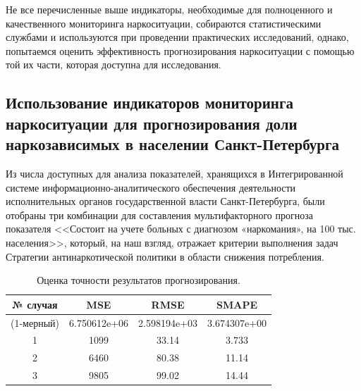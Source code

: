 Не все перечисленные выше индикаторы, необходимые для полноценного и 
качественного мониторинга наркоситуации, собираются статистическими службами 
и используются при проведении практических исследований, однако, попытаемся 
оценить эффективность прогнозирования наркоситуации с помощью той их части, 
которая доступна для исследования.

\subsection{Использование индикаторов мониторинга наркоситуации для 
    прогнозирования доли наркозависимых в населении Санкт-Петербурга}

Из числа доступных для анализа показателей, хранящихся в Интегрированной системе 
информационно-аналитического обеспечения деятельности исполнительных органов 
государственной власти Санкт-Петербурга, были отобраны три комбинации для 
составления мультифакторного прогноза показателя <<Состоит на учете больных с 
диагнозом «наркомания», на 100 тыс. населения>>, который, на наш взгляд, 
отражает критерии выполнения задач Стратегии антинаркотической политики в 
области снижения потребления.

\begin{table}[bhtp]
    \caption{Оценка точности результатов прогнозирования.}
    \begin{center}
        \begin{tabular}{ | c | c | c | c | }
            \hline
            № случая & MSE & RMSE & SMAPE \\
            \hline
            (1-мерный) & 6.750612e+06 & 2.598194e+03 & 3.674307e+00  \\
            \hline
            1 & 1099 & 33.14 & 3.733  \\
            \hline
            2 & 6460 & 80.38 & 11.14  \\
            \hline
            3 & 9805 & 99.02 & 14.44  \\
            \hline
        \end{tabular}		
    \end{center}
    \label{table:WM-error-multi}	
\end{table}

